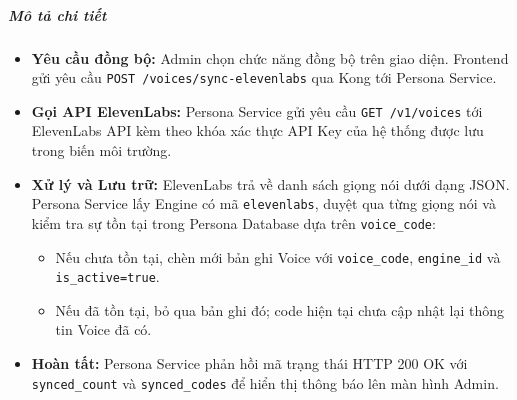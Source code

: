 \subparagraph{Mô tả chi tiết}
\begin{itemize}
\item \textbf{Yêu cầu đồng bộ:} Admin chọn chức năng đồng bộ trên giao diện. Frontend gửi yêu cầu \texttt{POST /voices/sync-elevenlabs} qua Kong tới Persona Service.
\item \textbf{Gọi API ElevenLabs:} Persona Service gửi yêu cầu \texttt{GET /v1/voices} tới ElevenLabs API kèm theo khóa xác thực API Key của hệ thống được lưu trong biến môi trường.
\item \textbf{Xử lý và Lưu trữ:} ElevenLabs trả về danh sách giọng nói dưới dạng JSON. Persona Service lấy Engine có mã \texttt{elevenlabs}, duyệt qua từng giọng nói và kiểm tra sự tồn tại trong Persona Database dựa trên \texttt{voice\_code}:
\begin{itemize}
\item Nếu chưa tồn tại, chèn mới bản ghi Voice với \texttt{voice\_code}, \texttt{engine\_id} và \texttt{is\_active=true}.
\item Nếu đã tồn tại, bỏ qua bản ghi đó; code hiện tại chưa cập nhật lại thông tin Voice đã có.
\end{itemize}
\item \textbf{Hoàn tất:} Persona Service phản hồi mã trạng thái HTTP 200 OK với \texttt{synced\_count} và \texttt{synced\_codes} để hiển thị thông báo lên màn hình Admin.
\end{itemize}

